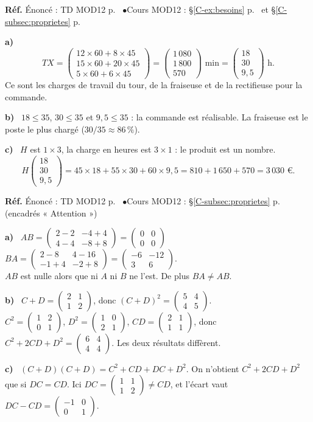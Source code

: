\documentclass[a4paper,11pt]{article}
\newcommand{\M}[1]{\begin{pmatrix}#1\end{pmatrix}}
\newcommand{\cours}[1]{§\ref{C-#1} p.~\pageref{C-#1}}
\newcommand{\source}[2]{{\footnotesize\color{uimmgray}\textbf{Réf.} \enspace Énoncé : TD MOD12 p.~\pageref{T-#1} \enspace$\bullet$\enspace Cours MOD12 : #2}\par\smallskip}
\newcommand{\q}[1]{\textbf{\color{uimmblue}#1}\ }
\begin{document}
\begin{correction}
\source{exo:6}{\cours{ex:besoins} et \cours{subsec:proprietes}}
\q{a)}
\[
TX = \M{12\times 60 + 8\times 45\\ 15\times 60 + 20\times 45\\ 5\times 60 + 6\times 45} = \M{1\,080\\ 1\,800\\ 570} \text{ min} = \M{18\\ 30\\ 9{,}5} \text{ h}.
\]
Ce sont les charges de travail du tour, de la fraiseuse et de la rectifieuse pour la commande.

\q{b)} $18 \leq 35$, $30\leq 35$ et $9{,}5\leq 35$ : la commande est réalisable. La fraiseuse est le poste le plus chargé ($30/35\approx 86\,\%$).

\q{c)} $H$ est $1\times 3$, la charge en heures est $3\times 1$ : le produit est un nombre.
\[
H\M{18\\30\\9{,}5} = 45\times 18 + 55\times 30 + 60\times 9{,}5 = 810 + 1\,650 + 570 = 3\,030 \text{ €.}
\]
\end{correction}

\begin{correction}
\source{exo:7}{\cours{subsec:proprietes} (encadrés « Attention »)}
\q{a)} $AB = \M{2-2 & -4+4\\ 4-4 & -8+8} = \M{0 & 0\\ 0 & 0}$ \qquad $BA = \M{2-8 & 4-16\\ -1+4 & -2+8} = \M{-6 & -12\\ 3 & 6}$.\\
$AB$ est nulle alors que ni $A$ ni $B$ ne l'est. De plus $BA\neq AB$.

\q{b)} $C + D = \M{2 & 1\\ 1 & 2}$, donc $(C+D)^2 = \M{5 & 4\\ 4 & 5}$.\\
$C^2 = \M{1 & 2\\ 0 & 1}$, $D^2 = \M{1 & 0\\ 2 & 1}$, $CD = \M{2 & 1\\ 1 & 1}$, donc $C^2 + 2CD + D^2 = \M{6 & 4\\ 4 & 4}$. Les deux résultats diffèrent.

\q{c)} $(C+D)(C+D) = C^2 + CD + DC + D^2$. On n'obtient $C^2 + 2CD + D^2$ que si $DC = CD$. Ici $DC = \M{1 & 1\\ 1 & 2}\neq CD$, et l'écart vaut $DC - CD = \M{-1 & 0\\ 0 & 1}$.
\end{correction}
\end{document}
